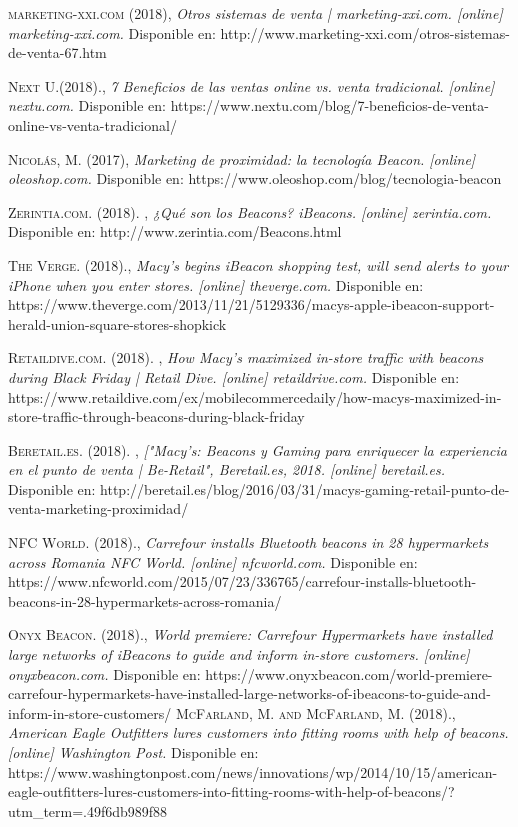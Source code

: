 \begin{thebibliography}{}
 \textsc{marketing-xxi.com (2018)},
\textit{Otros sistemas de venta | marketing-xxi.com. [online] marketing-xxi.com.}
Disponible en: http://www.marketing-xxi.com/otros-sistemas-de-venta-67.htm

 \textsc{Next U.(2018).}, 
\textit{7 Beneficios de las ventas online vs. venta tradicional. [online] nextu.com.}
Disponible en: https://www.nextu.com/blog/7-beneficios-de-venta-online-vs-venta-tradicional/

 \textsc{Nicolás, M. (2017)},
\textit{Marketing de proximidad: la tecnología Beacon. [online] oleoshop.com.}
Disponible en: https://www.oleoshop.com/blog/tecnologia-beacon

 \textsc{Zerintia.com. (2018). }, 
\textit{¿Qué son los Beacons? iBeacons. [online] zerintia.com.}
Disponible en: http://www.zerintia.com/Beacons.html


 \textsc{The Verge. (2018).}, 
\textit{ Macy's begins iBeacon shopping test, will send alerts to your iPhone when you enter stores. [online] theverge.com.}
Disponible en: https://www.theverge.com/2013/11/21/5129336/macys-apple-ibeacon-support-herald-union-square-stores-shopkick

 \textsc{Retaildive.com. (2018). }, 
\textit{How Macy’s maximized in-store traffic with beacons during Black Friday | Retail Dive. [online] retaildrive.com.}
Disponible en: https://www.retaildive.com/ex/mobilecommercedaily/how-macys-maximized-in-store-traffic-through-beacons-during-black-friday

 \textsc{Beretail.es. (2018). }, 
\textit{["Macy’s: Beacons y Gaming para enriquecer la experiencia en el punto de venta | Be-Retail", Beretail.es, 2018. [online] beretail.es.}
Disponible en: http://beretail.es/blog/2016/03/31/macys-gaming-retail-punto-de-venta-marketing-proximidad/

 \textsc{NFC World. (2018).}, 
\textit{Carrefour installs Bluetooth beacons in 28 hypermarkets across Romania NFC World. [online] nfcworld.com.}
Disponible en: https://www.nfcworld.com/2015/07/23/336765/carrefour-installs-bluetooth-beacons-in-28-hypermarkets-across-romania/

 \textsc{Onyx Beacon. (2018).}, 
\textit{World premiere: Carrefour Hypermarkets have installed large networks of iBeacons to guide and inform in-store customers. [online] onyxbeacon.com. }
Disponible en: https://www.onyxbeacon.com/world-premiere-carrefour-hypermarkets-have-installed-large-networks-of-ibeacons-to-guide-and-inform-in-store-customers/
 \textsc{McFarland, M. and McFarland, M. (2018).}, 
\textit{American Eagle Outfitters lures customers into fitting rooms with help of beacons. [online] Washington Post.}
Disponible en: https://www.washingtonpost.com/news/innovations/wp/2014/10/15/american-eagle-outfitters-lures-customers-into-fitting-rooms-with-help-of-beacons/?utm\_term=.49f6db989f88


\end{thebibliography}

